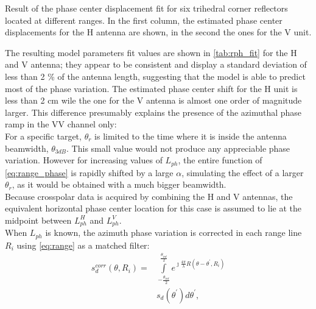 \begin{table}[ht]
	\centering
	\caption{Result of the phase center displacement fit for six trihedral corner reflectors located at different ranges. In the first column, the estimated phase center displacements for the H antenna are shown, in the second the ones for the V unit.}
	\label{tab:rph_fit}
\end{table}
The resulting model parameters fit values  are shown in \autoref{tab:rph_fit} for the H and V antenna; they appear to be consistent and display a standard deviation of less than 2 \% of the antenna length, suggesting that the model is able to predict most of the phase variation. The estimated phase center shift for the H unit is less than 2 cm wile the one for the V antenna is almost one order of magnitude larger. This difference presumably explains the presence of the azimuthal phase ramp in the VV channel only:\\
For a specific target,  $\theta_r$ is limited to the time where it is inside the antenna beamwidth, $\theta_{3dB}$. This small value would not produce any appreciable phase variation. However for increasing values of $L_{ph}$, the entire function of \autoref{eq:range_phase} is rapidly shifted  by a large $\alpha$, simulating the effect of a larger $\theta_r$, as it would be obtained with a much bigger beamwidth.\\
Because crosspolar data is acquired by combining the H and V antennas, the equivalent horizontal phase center location for this case is assumed to lie at the midpoint between $L_{ph}^{H}$ and $L_{ph}^{V}$.\\
When $L_{ph}$ is known, the azimuth phase variation is corrected in each range line $R_{i}$ using \autoref{eq:range} as a matched filter:
\begin{equation}\label{eq:correction}
	\begin{aligned}
		s_{d}^{corr}\left(\theta, R_{i}\right) = &\int\limits_{-\frac{\theta_{int}}{2}}^{\frac{\theta_{int}}{2}}e^{\jmath \frac{4\pi}{\lambda}R\left(\theta - \theta^{\prime}, R_{i}\right)}\\
		&s_{d}\left(\theta^\prime\right) d\theta^\prime,
	\end{aligned}
\end{equation}
